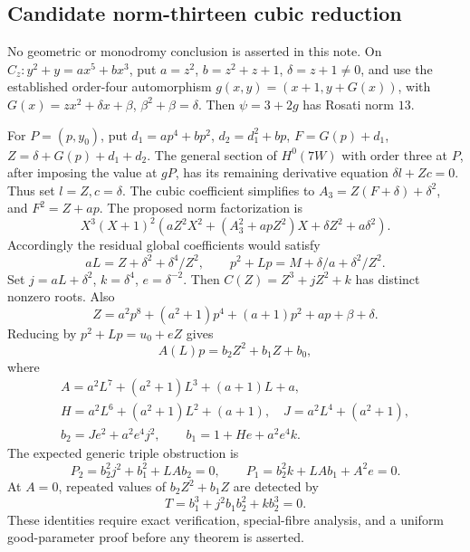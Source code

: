 \subsection*{Candidate norm-thirteen cubic reduction}
No geometric or monodromy conclusion is asserted in this note.
On $C_z:y^2+y=ax^5+bx^3$, put $a=z^2$, $b=z^2+z+1$,
$\delta=z+1\ne0$, and use the established order-four automorphism
$g(x,y)=(x+1,y+G(x))$, with
$G(x)=zx^2+\delta x+\beta$, $\beta^2+\beta=\delta$.
Then $\psi=3+2g$ has Rosati norm $13$.

For $P=(p,y_0)$, put $d_1=ap^4+bp^2$, $d_2=d_1^2+bp$,
$F=G(p)+d_1$, $Z=\delta+G(p)+d_1+d_2$.
The general section of $H^0(7W)$ with order three at $P$, after imposing
the value at $gP$, has its remaining derivative equation
$\delta l+Zc=0$. Thus set $l=Z,c=\delta$.
The cubic coefficient simplifies to
$A_3=Z(F+\delta)+\delta^2$, and $F^2=Z+ap$.
The proposed norm factorization is
\[
 X^3(X+1)^2\left(aZ^2X^2+(A_3^2+apZ^2)X
                         +\delta Z^2+a\delta^2\right).
\]
Accordingly the residual global coefficients would satisfy
\[
 aL=Z+\delta^2+\delta^4/Z^2,\qquad
 p^2+Lp=M+\delta/a+\delta^2/Z^2.
\]
Set $j=aL+\delta^2$, $k=\delta^4$, $e=\delta^{-2}$.
Then $C(Z)=Z^3+jZ^2+k$ has distinct nonzero roots.
Also
\[
 Z=a^2p^8+(a^2+1)p^4+(a+1)p^2+ap+\beta+\delta.
\]
Reducing by $p^2+Lp=u_0+eZ$ gives
\[
 A(L)p=b_2Z^2+b_1Z+b_0,
\]
where
\[
\begin{gathered}
 A=a^2L^7+(a^2+1)L^3+(a+1)L+a,\\
 H=a^2L^6+(a^2+1)L^2+(a+1),\quad J=a^2L^4+(a^2+1),\\
 b_2=Je^2+a^2e^4j^2,\qquad b_1=1+He+a^2e^4k.
\end{gathered}
\]
The expected generic triple obstruction is
\[
 P_2=b_2^2j^2+b_1^2+LA b_2=0,\qquad
 P_1=b_2^2k+LA b_1+A^2e=0.
\]
At $A=0$, repeated values of $b_2Z^2+b_1Z$ are detected by
\[
 T=b_1^3+j^2b_1b_2^2+kb_2^3=0.
\]
These identities require exact verification, special-fibre analysis,
and a uniform good-parameter proof before any theorem is asserted.
